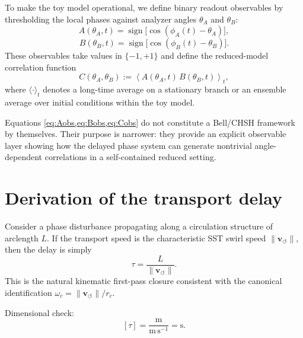 \documentclass[11pt]{article}
\newcommand{\vnorm}{\lVert \mathbf{v}_{\!\boldsymbol{\circlearrowleft}}\rVert}
\newcommand{\rc}{r_c}
\begin{document}
        To make the toy model operational, we define binary readout observables by thresholding the local phases against analyzer angles \(\theta_A\) and \(\theta_B\):
        \begin{equation}
            A(\theta_A,t)=\operatorname{sign}\!\big[\cos(\phi_A(t)-\theta_A)\big],
            \label{eq:Aobs}
        \end{equation}
        \begin{equation}
            B(\theta_B,t)=\operatorname{sign}\!\big[\cos(\phi_B(t)-\theta_B)\big].
            \label{eq:Bobs}
        \end{equation}
        These observables take values in \(\{-1,+1\}\) and define the reduced-model correlation function
        \begin{equation}
            C(\theta_A,\theta_B)
            :=
            \left\langle
            A(\theta_A,t)\,B(\theta_B,t)
            \right\rangle_t,
            \label{eq:Cobs}
        \end{equation}
        where \(\langle\cdot\rangle_t\) denotes a long-time average on a stationary branch or an ensemble average over initial conditions within the toy model.

        Equations \cref{eq:Aobs,eq:Bobs,eq:Cobs} do not constitute a Bell/CHSH framework by themselves. Their purpose is narrower: they provide an explicit observable layer showing how the delayed phase system can generate nontrivial angle-dependent correlations in a self-contained reduced setting.
    
    \section{Derivation of the transport delay}
        
        Consider a phase disturbance propagating along a circulation structure of arclength \(L\). If the transport speed is the characteristic SST swirl speed \(\vnorm\), then the delay is simply
        \begin{equation}
            \boxed{
                \tau=\frac{L}{\vnorm}.
            }
            \label{eq:tau_basic}
        \end{equation}
        This is the natural kinematic first-pass closure consistent with the canonical identification \(\omega_c=\vnorm/\rc\).
        
        Dimensional check:
        \[
            [\tau]=\frac{\mathrm{m}}{\mathrm{m\,s^{-1}}}=\mathrm{s}.
        \]
        
\end{document}
